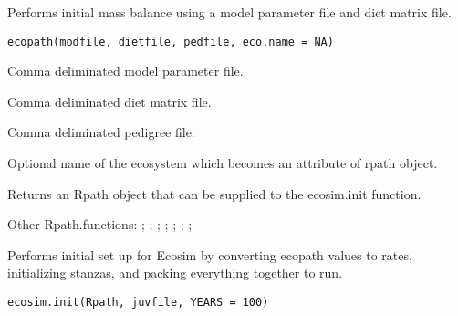 \documentclass[a4paper]{book}
\begin{document}
%
\begin{Description}\relax
Performs initial mass balance using a model parameter file and diet
matrix file.
\end{Description}
%
\begin{Usage}
\begin{verbatim}
ecopath(modfile, dietfile, pedfile, eco.name = NA)
\end{verbatim}
\end{Usage}
%
\begin{Arguments}
\begin{ldescription}
\item[\code{modfile}] Comma deliminated model parameter file.

\item[\code{dietfile}] Comma deliminated diet matrix file.

\item[\code{pedfile}] Comma deliminated pedigree file.

\item[\code{eco.name}] Optional name of the ecosystem which becomes an attribute of
rpath object.
\end{ldescription}
\end{Arguments}
%
\begin{Value}
Returns an Rpath object that can be supplied to the ecosim.init function.
\end{Value}
%
\begin{SeeAlso}\relax
Other Rpath.functions: ;
;
; ;
; ;
; 
\end{SeeAlso}
%
\begin{Description}\relax
Performs initial set up for Ecosim by converting ecopath values to rates,
initializing stanzas, and packing everything together to run.
\end{Description}
%
\begin{Usage}
\begin{verbatim}
ecosim.init(Rpath, juvfile, YEARS = 100)
\end{verbatim}
\end{Usage}
\end{document}
